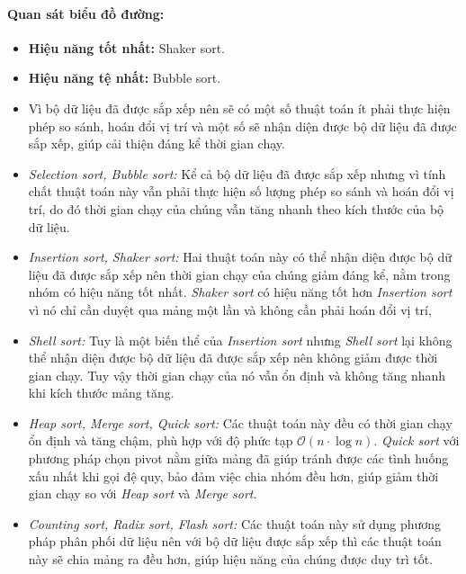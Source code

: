     \paragraph{Quan sát biểu đồ đường:}
    \begin{itemize}
        \item \textbf{Hiệu năng tốt nhất:} Shaker sort.
        \item \textbf{Hiệu năng tệ nhất:} Bubble sort.
        \item Vì bộ dữ liệu đã được sắp xếp nên sẽ có một số thuật toán ít phải thực hiện phép so sánh, hoán đổi vị trí và một số sẽ nhận diện được bộ dữ liệu đã được sắp xếp, giúp cải thiện đáng kể thời gian chạy.
        \item \textit{Selection sort, Bubble sort: } Kể cả bộ dữ liệu đã được sắp xếp nhưng vì tính chất thuật toán này vẫn phải thực hiện số lượng phép so sánh và hoán đổi vị trí, do đó thời gian chạy của chúng vẫn tăng nhanh theo kích thước của bộ dữ liệu.
        \item \textit{Insertion sort, Shaker sort: } Hai thuật toán này có thể nhận diện được bộ dữ liệu đã được sắp xếp nên thời gian chạy của chúng giảm đáng kể, nằm trong nhóm có hiệu năng tốt nhất. \textit{Shaker sort} có hiệu năng tốt hơn \textit{Insertion sort} vì nó chỉ cần duyệt qua mảng một lần và không cần phải hoán đổi vị trí, 
        \item \textit{Shell sort: } Tuy là một biến thể của \textit{Insertion sort} nhưng \textit{Shell sort} lại không thể nhận diện được bộ dữ liệu đã được sắp xếp nên không giảm được thời gian chạy. Tuy vậy thời gian chạy của nó vẫn ổn định và không tăng nhanh khi kích thước mảng tăng.
        \item \textit{Heap sort, Merge sort, Quick sort: } Các thuật toán này đều có thời gian chạy ổn định và tăng chậm, phù hợp với độ phức tạp $\mathcal{O}(n \cdot \log n)$. \textit{Quick sort} với phương pháp chọn pivot nằm giữa mảng đã giúp tránh được các tình huống xấu nhất khi gọi đệ quy, bảo đảm việc chia nhóm đều hơn, giúp giảm thời gian chạy so với \textit{Heap sort} và \textit{Merge sort}.
        \item \textit{Counting sort, Radix sort, Flash sort: } Các thuật toán này sử dụng phương pháp phân phối dữ liệu nên với bộ dữ liệu được sắp xếp thì các thuật toán này sẽ chia mảng ra đều hơn, giúp hiệu năng của chúng được duy trì tốt.
    \end{itemize}    

